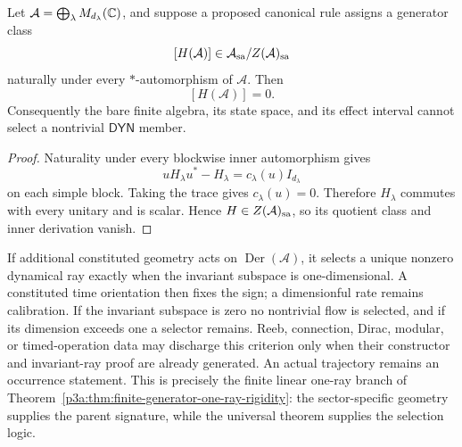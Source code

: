 \documentclass[12pt,a4paper]{article}
\begin{document}
\begin{proposition}
\label{p4:prop:bare-algebra-dynamics-no-selector}
Let
\(\mathcal A=\bigoplus_\lambda M_{d_\lambda}(\mathbb{C})\), and suppose a proposed
canonical rule assigns a generator class
\[
 [H(\mathcal A)]\in
 \mathcal A_{\rm sa}/Z(\mathcal A)_{\rm sa}
\]
naturally under every \(*\)-automorphism of \(\mathcal A\).  Then
\[
 \boxed{[H(\mathcal A)]=0.}
\]
Consequently the bare finite algebra, its state space, and its effect
interval cannot select a nontrivial \(\mathsf{DYN}\) member.
\end{proposition}

\begin{proof}
Naturality under every blockwise inner automorphism gives
\[
 uH_\lambda u^*-H_\lambda=c_\lambda(u)I_{d_\lambda}
\]
on each simple block.  Taking the trace gives \(c_\lambda(u)=0\).
Therefore \(H_\lambda\) commutes with every unitary and is scalar.  Hence
\(H\in Z(\mathcal A)_{\rm sa}\), so its quotient class and inner derivation
vanish.
\end{proof}

\begin{remark}
\label{p4:rem:one-ray-dynamics-criterion}
If additional constituted geometry acts on
\(\operatorname{Der}(\mathcal A)\), it selects a unique nonzero dynamical ray
exactly when the invariant subspace is one-dimensional.  A constituted time
orientation then fixes the sign; a dimensionful rate remains calibration.
If the invariant subspace is zero no nontrivial flow is selected, and if its
dimension exceeds one a selector remains.  Reeb, connection, Dirac, modular,
or timed-operation data may discharge this criterion only when their
constructor and invariant-ray proof are already generated.  An actual
trajectory remains an occurrence statement.
This is precisely the finite linear one-ray branch of
Theorem~\ref{p3a:thm:finite-generator-one-ray-rigidity}: the sector-specific
geometry supplies the parent signature, while the universal theorem supplies
the selection logic.
\end{remark}
\end{document}
